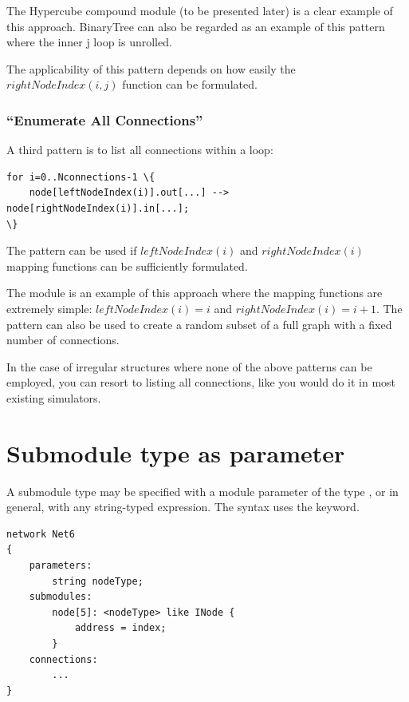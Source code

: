 The Hypercube compound module (to be
presented later) is a clear example of this approach. BinaryTree can
also be regarded as an example of this pattern where the inner j loop
is unrolled.

The applicability of this pattern depends on how easily the $rightNodeIndex(i,j)$
function can be formulated.


\subsubsection{``Enumerate All Connections''}


A third pattern is to list all connections within a loop:

\begin{Verbatim}[commandchars=\\\{\}]
for i=0..Nconnections-1 \{
    node[leftNodeIndex(i)].out[...] --> node[rightNodeIndex(i)].in[...];
\}
\end{Verbatim}

The pattern can be used if $leftNodeIndex(i)$ and $rightNodeIndex(i)$
mapping functions can be sufficiently formulated.

The  module is an example of this approach where the mapping
functions are extremely simple: $leftNodeIndex(i)=i$ and $rightNodeIndex(i) = i+1$.
The pattern can also be used to create a random subset of a full
graph with a fixed number of connections.

In the case of irregular structures where none of the above patterns
can be employed, you can resort to listing all connections, like you
would do it in most existing simulators.



\section{Submodule type as parameter}
\label{sec:ch-ned-lang:submodule-like}

A submodule type may be specified with a module parameter of the type
, or in general, with any string-typed expression.
The syntax uses the  keyword.

\begin{Verbatim}
network Net6
{
    parameters:
        string nodeType;
    submodules:
        node[5]: <nodeType> like INode {
            address = index;
        }
    connections:
        ...
}
\end{Verbatim}

